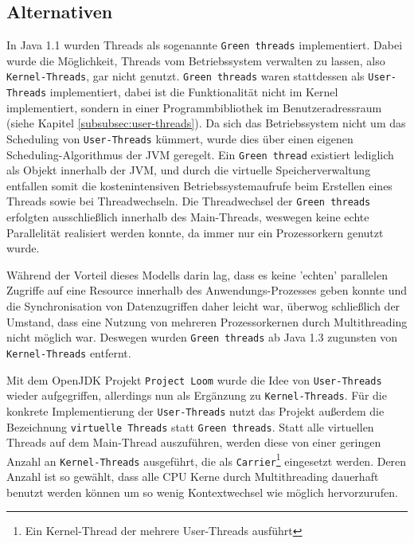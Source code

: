 \subsection{Alternativen}
\label{subsec:alternativen}
In Java 1.1 wurden Threads als sogenannte \verb|Green threads| implementiert.
Dabei wurde die Möglichkeit, Threads vom Betriebssystem verwalten zu lassen, also \verb|Kernel-Threads|,
gar nicht genutzt.
\verb|Green threads| waren stattdessen als \verb|User-Threads| implementiert,
dabei ist die Funktionalität
nicht im Kernel implementiert, sondern in einer Programmbibliothek im Benutzeradressraum (siehe Kapitel \ref{subsubsec:user-threads}).
Da sich das Betriebssystem nicht um das Scheduling von \verb|User-Threads| kümmert, wurde dies über einen eigenen
Scheduling-Algorithmus der JVM geregelt.\parencite{Oracle2010}
Ein \verb|Green thread| existiert lediglich als Objekt innerhalb der JVM, und durch die virtuelle Speicherverwaltung entfallen
somit die kostenintensiven Betriebssystemaufrufe beim
Erstellen eines Threads sowie bei Threadwechseln.
Die Threadwechsel der \verb|Green threads| erfolgten ausschließlich innerhalb des Main-Threads, weswegen keine echte Parallelität
realisiert werden konnte, da immer nur ein Prozessorkern genutzt wurde.

Während der Vorteil dieses Modells darin lag, dass es keine 'echten' parallelen Zugriffe auf eine Resource innerhalb des Anwendungs-Prozesses geben konnte
und die Synchronisation von Datenzugriffen daher leicht war, überwog schließlich der Umstand, dass eine Nutzung von mehreren Prozessorkernen
durch Multithreading nicht möglich war. Deswegen wurden \verb|Green threads| ab Java 1.3 zugunsten von \verb|Kernel-Threads| entfernt.\newline

Mit dem OpenJDK Projekt \verb|Project Loom| wurde die Idee von \verb|User-Threads| wieder aufgegriffen, allerdings nun als Ergänzung zu \verb|Kernel-Threads|.
Für die konkrete Implementierung der \verb|User-Threads| nutzt das Projekt außerdem die Bezeichnung \verb|virtuelle Threads| statt \verb|Green threads|.
Statt alle virtuellen Threads auf dem Main-Thread auszuführen, werden diese von einer geringen Anzahl an
\verb|Kernel-Threads| ausgeführt, die als \verb|Carrier|\footnote{Ein Kernel-Thread der mehrere User-Threads ausführt} eingesetzt werden.
Deren Anzahl ist so gewählt, dass alle CPU Kerne durch Multithreading dauerhaft benutzt werden
können um so wenig Kontextwechsel wie möglich hervorzurufen.\parencite{Oracle2021}

